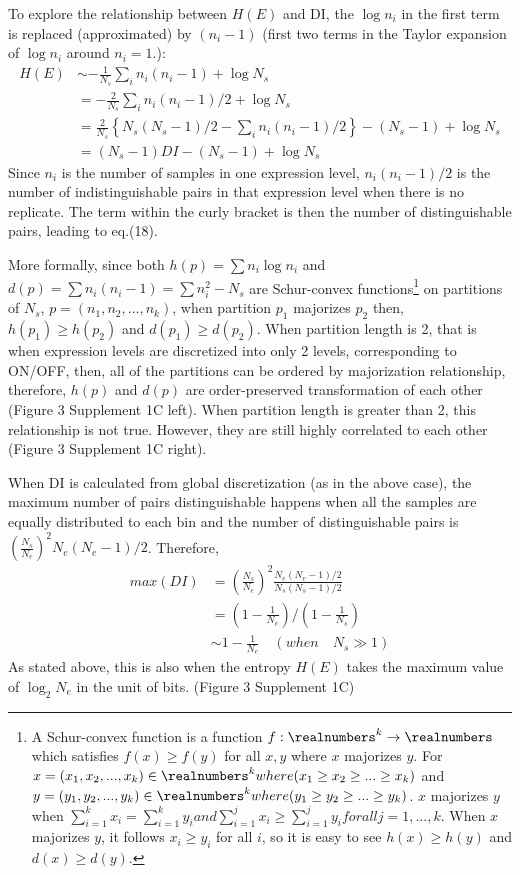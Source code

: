To explore the relationship between $H(E)$ and DI, the $\log n_i$ in the first term is replaced (approximated) by $(n_i-1)$ (first two terms in the Taylor expansion of $\log n_i$ around $n_i=1$.):
\begin{align}
H(E) &\sim -\frac{1}{N_s}\sum_{i}n_i (n_i-1) + \log N_s \\
	 &= -\frac{2}{N_s}\sum_{i}n_i (n_i-1)/2 + \log N_s \\
     &=  \frac{2}{N_s}\left\{N_s(N_s-1)/2 - \sum_{i}n_i (n_i-1)/2\right\} - (N_s-1) + \log N_s \\
     &= (N_s-1) DI - (N_s-1) + \log N_s 
\end{align}
Since $n_i$ is the number of samples in one expression level, $n_i(n_i-1)/2$ is the number of indistinguishable pairs in that expression level when there is no replicate. The term within the curly bracket is then the number of distinguishable pairs, leading to eq.(18). 

More formally, since both $h(p) = \sum{n_i\log n_i}$ and $d(p) = \sum n_i(n_i-1) = \sum n_i^2 - N_s$ are Schur-convex functions\footnote{A Schur-convex function is a function $f:\realnumbers^k \rightarrow \realnumbers$ which satisfies $f(x) \geq f(y)$ for all $x,y$ where $x$ majorizes $y$. For $x=(x_1,x_2,...,x_k) \in \realnumbers^k where (x_1 \geq x_2 \geq ... \geq x_k) $ and $y=(y_1,y_2,...,y_k) \in \realnumbers^k where (y_1 \geq y_2 \geq ... \geq y_k)$. $x$ majorizes $y$ when $\sum_{i=1}^{k} x_i = \sum_{i=1}^{k} y_i and \sum_{i=1}^{j} x_i \geq \sum_{i=1}^{j} y_i for all j=1,...,k$. When $x$ majorizes $y$, it follows $x_i \geq y_i$ for all $i$, so it is easy to see $h(x) \geq h(y)$ and $d(x) \geq d(y)$.} on partitions of $N_s$,  $p=(n_1,n_2,...,n_k)$, when partition $p_1$ majorizes $p_2$ then, $h(p_1)\geq h(p_2)$ and $d(p_1)\geq d(p_2)$. When partition length is 2, that is when expression levels are discretized into only 2 levels, corresponding to ON/OFF, then, all of the partitions can be ordered by majorization relationship, therefore, $h(p)$ and $d(p)$ are order-preserved transformation of each other (Figure 3 Supplement 1C left). When partition length is greater than 2, this relationship is not true. However, they are still highly correlated to each other (Figure 3 Supplement 1C right). 

When DI is calculated from global discretization (as in the above case), the maximum number of pairs distinguishable happens when all the samples are equally distributed to each bin and the number of distinguishable pairs is $\left( \frac{N_s}{N_e}\right)^2N_e(N_e-1)/2$. Therefore,
\begin{align}
max(DI) &= \left( \frac{N_s}{N_e}\right)^2 \frac{N_e(N_e-1)/2}{N_s(N_s-1)/2}\\
		&= \left( 1 - \frac{1}{N_e} \right) / \left( 1 - \frac{1}{N_s} \right) \\
        &\sim 1 - \frac{1}{N_e} \quad(when\quad N_s \gg 1)
\end{align}
As stated above, this is also when the entropy $H(E)$ takes the maximum value of $\log_{2} N_e$ in the unit of bits. (Figure 3 Supplement 1C)
